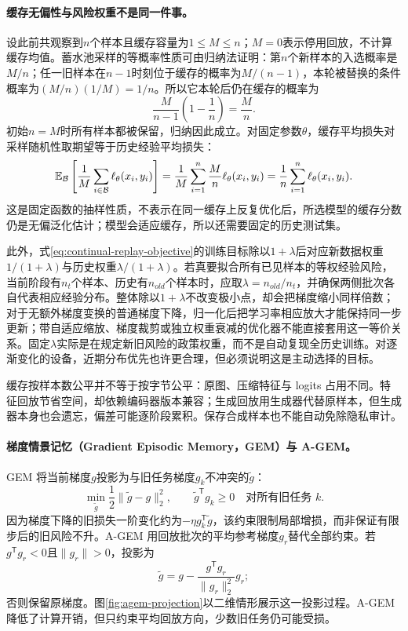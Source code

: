 \paragraph{缓存无偏性与风险权重不是同一件事。}
设此前共观察到$n$个样本且缓存容量为$1\leq M\leq n$；$M=0$表示停用回放，不计算缓存均值。蓄水池采样的等概率性质可由归纳法证明：第$n$个新样本的入选概率是$M/n$；任一旧样本在$n-1$时刻位于缓存的概率为$M/(n-1)$，本轮被替换的条件概率为$(M/n)(1/M)=1/n$。所以它本轮后仍在缓存的概率为
\begin{equation}
 \frac{M}{n-1}\left(1-\frac1n\right)=\frac Mn.
\end{equation}
初始$n=M$时所有样本都被保留，归纳因此成立。对固定参数$\theta$，缓存平均损失对采样随机性取期望等于历史经验平均损失：
\begin{equation}
 \mathbb{E}_{\mathcal B}\left[\frac1M\sum_{i\in\mathcal B}\ell_\theta(x_i,y_i)\right]
 =\frac1M\sum_{i=1}^n\frac Mn\ell_\theta(x_i,y_i)
 =\frac1n\sum_{i=1}^n\ell_\theta(x_i,y_i).
\end{equation}
这是固定函数的抽样性质，不表示在同一缓存上反复优化后，所选模型的缓存分数仍是无偏泛化估计；模型会适应缓存，所以还需要固定的历史测试集。

此外，式\eqref{eq:continual-replay-objective}的训练目标除以$1+\lambda$后对应新数据权重$1/(1+\lambda)$与历史权重$\lambda/(1+\lambda)$。若真要拟合所有已见样本的等权经验风险，当前阶段有$n_t$个样本、历史有$n_{old}$个样本时，应取$\lambda=n_{old}/n_t$，并确保两侧批次各自代表相应经验分布。整体除以$1+\lambda$不改变极小点，却会把梯度缩小同样倍数；对于无额外梯度变换的普通梯度下降，归一化后把学习率相应放大才能保持同一步更新；带自适应缩放、梯度裁剪或独立权重衰减的优化器不能直接套用这一等价关系。固定$\lambda$实际是在规定新旧风险的政策权重，而不是自动复现全历史训练。对逐渐变化的设备，近期分布优先也许更合理，但必须说明这是主动选择的目标。

缓存按样本数公平并不等于按字节公平：原图、压缩特征与 logits 占用不同。特征回放节省空间，却依赖编码器版本兼容；生成回放用生成器代替原样本，但生成器本身也会遗忘，偏差可能逐阶段累积\cite{shin2017replay}。保存合成样本也不能自动免除隐私审计。

\paragraph{梯度情景记忆（Gradient Episodic Memory，GEM）与 A-GEM。}
GEM 将当前梯度$g$投影为与旧任务梯度$g_k$不冲突的$\tilde g$\cite{lopezpaz2017gem}：
\begin{equation}
 \min_{\tilde g}\frac12\|\tilde g-g\|_2^2,
 \qquad \tilde g^{\mathsf T}g_k\geq0\quad\text{对所有旧任务 }k.
\end{equation}
因为梯度下降的旧损失一阶变化约为$-\eta g_k^{\mathsf T}\tilde g$，该约束限制局部增损，而非保证有限步后的旧风险不升。A-GEM 用回放批次的平均参考梯度$g_r$替代全部约束\cite{chaudhry2019agem}。若$g^{\mathsf T}g_r<0$且$\|g_r\|>0$，投影为
\begin{equation}
 \tilde g=g-\frac{g^{\mathsf T}g_r}{\|g_r\|_2^2}g_r;
\end{equation}
否则保留原梯度。图\ref{fig:agem-projection}以二维情形展示这一投影过程。A-GEM 降低了计算开销，但只约束平均回放方向，少数旧任务仍可能受损。

